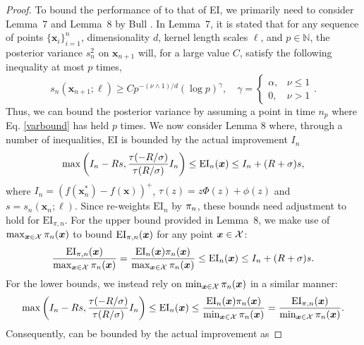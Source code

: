 \begin{proof}
To bound the performance of \pei{} to that of EI, we primarily need to consider Lemma~7 and Lemma~8 by Bull \cite{JMLR:v12:bull11a}. In Lemma~7, it is stated that for any sequence of points $\{\bm{x}_i\}_{i=1}^n$, dimensionality $d$, kernel length scales ${\bm{\ell}}$, and $p \in \mathbb{N}$, the posterior variance $s^2_n$ 
on $\bm{x}_{n+1}$ will, for a large value $C$, satisfy the following inequality at most $p$ times, 
\begin{equation} \label{varbound}
    s_n(\bm{x}_{n+1}; \bm{\ell}) \geq Cp^{-(\nu \land 1)/d}(\log p)^\gamma, \quad \gamma = \begin{cases}
		\alpha, & \nu \leq 1\\
        0, & \nu > 1
	\end{cases}.
\end{equation}
Thus, we can bound the posterior variance by assuming a point in time $n_p$ where Eq. \ref{varbound} has held $p$ times. 
We now consider Lemma 8 where, through a number of inequalities, EI is bounded by the actual improvement $I_n$
\begin{equation}
    \max\left(I_n-Rs, \frac{\tau(-R/\sigma)}{\tau(R/\sigma)}I_n   \right) \leq \text{EI}_{n}(\bm{x}) \leq I_n + (R + \sigma)s,
\end{equation}
where $I_n = (f(\bm{x}^*_n) - f(\bm{x}))^+$, $\tau(z) = z\Phi(z) + \phi(z)$ and $s = s_n(\bm{x}_{n}; \bm{\ell})$. Since \method re-weights $\text{EI}_n$ by ${\pi}_n$, these bounds need adjustment to hold for $\text{EI}_{\pi, n}$. 
For the upper bound provided in Lemma~8, we make use of $\max_{\bm{x}\in\mathcal{X}} {\pi}_n(\bm{x})$ to bound $\text{EI}_{\pi,n}(\bm{x})$ %
for any point $\bm{x}\in\mathcal{X}$: 
\begin{equation}
    \frac{\text{EI}_{\pi,n}(\bm{x})} {\max_{\bm{x}\in\mathcal{X}} {\pi}_n(\bm{x})} = \frac{\text{EI}_{n}(\bm{x}) {\pi}_n(\bm{x})} {\max_{\bm{x}\in\mathcal{X}}{\pi}_n(\bm{x})} \leq \text{EI}_{n}(\bm{x}) \leq I_n + (R + \sigma)s.
\end{equation}
For the lower bounds, we instead rely on $\min_{\bm{x}\in\mathcal{X}} {\pi}_n(\bm{x})$ in a similar manner:
\begin{equation}
    \max\left(I_n-Rs, \frac{\tau(-R/\sigma)}{\tau(R/\sigma)}I_n   \right) \leq \text{EI}_{n}(\bm{x}) \leq \frac{\text{EI}_{n}(\bm{x}) {\pi}_n(\bm{x})} {\min_{\bm{x}\in\mathcal{X}}{\pi}_n(\bm{x})}  = \frac{\text{EI}_{\pi,n}(\bm{x})} {\min_{\bm{x}\in\mathcal{X}} {\pi}_n(\bm{x})}.
\end{equation}
Consequently, \pei{} can be bounded by the actual improvement as

\end{proof}
